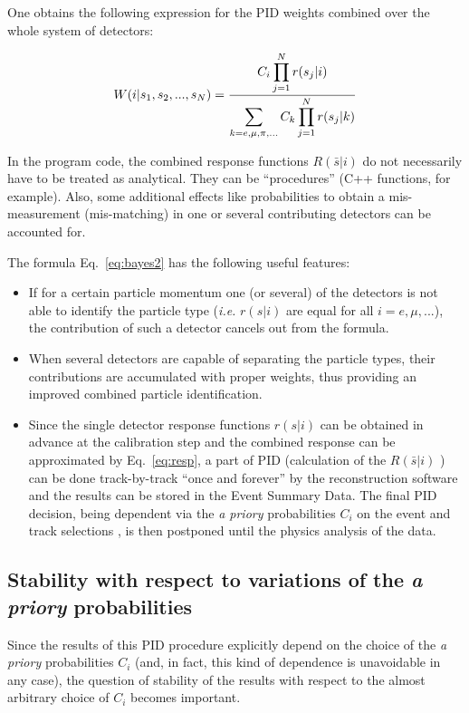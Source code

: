 \documentclass[12pt,a4paper,twoside]{article}
\begin{document}
{One obtains the following expression for the PID weights combined over the
whole system of detectors:

\begin{equation}\label{eq:bayes2}
  W(i|s_1, s_2, ..., s_N)={\displaystyle C_i \prod_{j=1}^{N}r(s_j|i) \over 
\displaystyle \sum_{k=e, \mu, \pi, ...}C_k \prod_{j=1}^{N}r(s_j|k)} 
\end{equation}


In the program code, the combined response functions $R(\bar{s}|i)$
do not necessarily have to be treated as analytical. They can be ``procedures''
(C++ functions, for example).  Also, some additional effects like 
probabilities to obtain a mis-measurement (mis-matching) in one or several
contributing detectors can be accounted for.

The formula Eq.~\ref{eq:bayes2} has the following useful features:
\begin{itemize}
\item If for a certain particle momentum one (or several) of the detectors 
  is not able to identify the particle type ({\it i.e.} $r(s|i)$ are equal 
  for all $i=e, \mu, ...$), the contribution of such a detector cancels out 
  from the formula.
\item When several detectors are capable of separating the particle types, 
their  contributions are accumulated with proper weights, thus providing 
an improved  combined particle identification.
\item Since the single detector response functions $r(s|i)$ can be obtained
  in advance at the calibration step and the combined response 
  can be approximated by Eq.~\ref{eq:resp}, a part of PID (calculation of
  the $R(\bar{s}|i)$ ) can be done track-by-track
  ``once and forever'' by the reconstruction software and the results
  can be stored in the Event Summary Data.  The final PID decision,
  being dependent  via the {\it a priory} probabilities $C_i$ on the event 
  and track selections , is then postponed until the physics analysis of the 
  data. 
\end{itemize}

\subsection{Stability with respect to variations of the {\it a priory} probabilities}
Since the results of this PID procedure explicitly depend on the choice
of the {\it a priory} probabilities $C_i$ (and, in fact, this kind of 
dependence is unavoidable in any case), the question of stability of the
results with respect to the almost arbitrary choice of $C_i$ becomes important.

}
\end{document}
